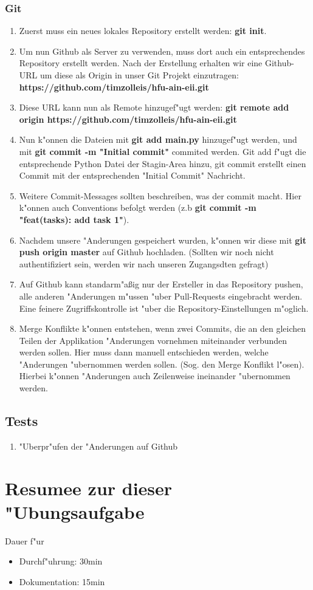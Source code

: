 \documentclass[a4paper,11pt,titlepage]{article}
\begin{document}
    \subsubsection{Git}
    \begin{enumerate}
        \item Zuerst muss ein neues lokales Repository erstellt werden: \textbf{git init}.
        \item Um nun Github als Server zu verwenden, muss dort auch ein entsprechendes Repository erstellt werden. Nach der Erstellung erhalten wir eine Github-URL um diese als Origin in unser Git Projekt einzutragen: \textbf{https://github.com/timzolleis/hfu-ain-eii.git}
        \item Diese URL kann nun als Remote hinzugef"ugt werden: \textbf{git remote add origin https://github.com/timzolleis/hfu-ain-eii.git}
        \item Nun k"onnen die Dateien mit \textbf{git add main.py} hinzugef"ugt werden, und mit \textbf{git commit -m "Initial commit"} commited werden. Git add f"ugt die entsprechende Python Datei der Stagin-Area hinzu, git commit erstellt einen Commit mit der entsprechenden "Initial Commit" Nachricht.
        \item Weitere Commit-Messages sollten beschreiben, was der commit macht. Hier k"onnen auch Conventions befolgt werden (z.b \textbf{git commit -m "feat(tasks): add task 1"}).
        \item Nachdem unsere "Anderungen gespeichert wurden, k"onnen wir diese mit \textbf{git push origin master} auf Github hochladen. (Sollten wir noch nicht authentifiziert sein, werden wir nach unseren Zugangsdten gefragt)
        \item Auf Github kann standarm"aßig nur der Ersteller in das Repository pushen, alle anderen "Anderungen m"ussen "uber Pull-Requests eingebracht werden. Eine feinere Zugriffskontrolle ist "uber die Repository-Einstellungen m"oglich.
        \item Merge Konflikte k"onnen entstehen, wenn zwei Commits, die an den gleichen Teilen der Applikation "Anderungen vornehmen miteinander verbunden werden sollen. Hier muss dann manuell entschieden werden, welche "Anderungen "ubernommen werden sollen. (Sog. den Merge Konflikt l"osen). Hierbei k"onnen "Anderungen auch Zeilenweise ineinander "ubernommen werden.
    \end{enumerate}

    \subsection{Tests}
    \begin{enumerate}
        \item "Uberpr"ufen der "Anderungen auf Github
    \end{enumerate}


    \section{Resumee zur dieser "Ubungsaufgabe}
    Dauer f"ur
    \begin{itemize}
        \item Durchf"uhrung: 30min
        \item Dokumentation: 15min
    \end{itemize}
\end{document}
